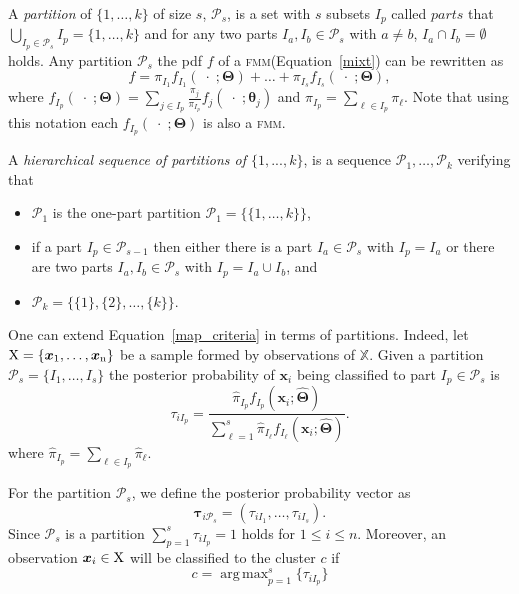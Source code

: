 \documentclass[10pt, a4paper]{article}
\DeclareMathOperator*{\argmax}{arg\,max}
\theoremstyle{definition}
\newcommand{\m}[1]{\boldsymbol{#1}}
\newcommand{\fmm}{\textsc{fmm}\xspace}
\begin{document}
\begin{spacing}{1.9}
%
A \emph{partition} of $\{1, \dots, k\}$ of size $s$, $\mathcal{P}_s$,  is a set with $s$ subsets $I_p$ called $parts$ that $\bigcup_{I_p \in \mathcal{P}_s} I_p = \{1, \dots, k\}$ and for any two parts $I_a, I_b \in \mathcal{P}_s$ with $a \neq b$, $I_a \cap I_b = \emptyset$ holds. Any partition  $\mathcal{P}_s$ the pdf $f$ of a \fmm (Equation~\ref{mixt}) can be rewritten as
\begin{equation}
f = \pi_{I_1} f_{I_1}(\;\cdot\;; \m\Theta) + \dots + \pi_{I_s} f_{I_s}(\;\cdot\;; \m\Theta),
\label{mixt_part}
\end{equation}
where $f_{I_p}(\;\cdot\;;  \m\Theta) = \sum_{j \in I_p} \frac{\pi_j}{\pi_{I_p}} f_j(\;\cdot\; ; \m\theta_j)$ and $\pi_{I_p} = \sum_{\ell \in I_p} \pi_\ell$. Note that using this notation each $f_{I_p}(\;\cdot\;;  \m\Theta)$ is also a \fmm.



A \emph{hierarchical sequence of partitions of $\{1,...,k\}$}, is a sequence $\mathcal{P}_1, \dots, \mathcal{P}_k$ verifying that
\begin{itemize}
\item $\mathcal{P}_1$ is the one-part partition $\mathcal{P}_1 = \{ \{1, \dots, k\} \}$,
\item if a part $I_p \in \mathcal{P}_{s-1}$ then either there is a part $I_a \in \mathcal{P}_{s}$ with $I_p = I_a$ or there are two parts $I_a, I_b \in \mathcal{P}_s$ with $I_p = I_a \cup I_b$, and
\item $\mathcal{P}_k= \{ \{1\},\{2\}, \dots, \{k\} \}$.
\end{itemize}



One can extend Equation~\ref{map_criteria} in terms of partitions. Indeed, let $\rm X = \{\m x_1,\dots, \m x_n\}$ be a sample formed by observations of $\mathbb{X}$. Given a partition $\mathcal{P}_s = \{ I_1, \dots, I_s \}$ the posterior probability of $\m x_i$ being classified to part $I_p\in \mathcal{P}_{s}$ is
\[
\tau_{i I_p} =  \frac{ \hat{\pi}_{I_p} f_{I_p}(\m x_i; \hat{\m\Theta}) }{\sum_{\ell=1}^s \hat{\pi}_{I_\ell} f_{I_\ell}(\m x_i; \hat{\m\Theta})}.
\]
where $\hat{\pi}_{I_p} = \sum_{\ell \in I_p} \hat{\pi}_\ell$.

For the partition  $\mathcal{P}_s$, we define the posterior probability vector as
\begin{equation}\label{ppv}
\m\tau_{i \mathcal{P}_s} = \left(\tau_{i I_1} , \dots, \tau_{i I_s}  \right).
\end{equation}
Since $\mathcal{P}_s$ is a partition $\sum_{p=1}^s \tau_{i I_p} = 1$ holds  for $1 \leq i \leq n$.
Moreover, an observation $\m x_i \in \rm X$ will be classified to the cluster $c$ if
\begin{equation}\label{cluster_criteria}
c= \argmax_{p=1}^s \{ \tau_{i I_p} \}
\end{equation}


\end{spacing}
\end{document}

